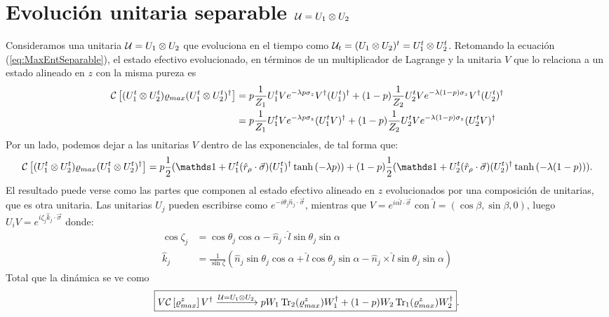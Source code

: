 \section{Evolución unitaria separable $\mathcal{U}=U_{1}\otimes U_{2}$}
Consideramos una unitaria $\mathcal{U}=U_{1}\otimes U_{2}$ que evoluciona en el tiempo como $\mathcal{U}_{t}=(U_{1}\otimes U_{2})^{t}=U_{1}^{t}\otimes U_{2}^{t}$. Retomando la ecuación (\ref{eq:MaxEntSeparable}), el estado efectivo evolucionado, en términos de un multiplicador de Lagrange y la unitaria $V$ que lo relaciona a un estado alineado en $z$ con la misma pureza es
\begin{align*}
    \mathcal{C}\left[(U_{1}^{t}\otimes U_{2}^{t})\varrho_{max}(U_{1}^{t}\otimes U_{2}^{t})^{\dag}\right]&=p\frac{1}{Z_{1}}U_{1}^{t}V e^{-\lambda p \sigma_{z}}V^{\dag}(U_{1}^t)^{\dag}+(1-p)\frac{1}{Z_{2}}U_{2}^{t}Ve^{-\lambda (1-p)\sigma_{z}}V^{\dag}(U_{2}^t)^{\dag}\\
    &=p\frac{1}{Z_{1}}U_{1}^{t}V e^{-\lambda p \sigma_{z}}(U_{1}^tV)^{\dag}+(1-p)\frac{1}{Z_{2}}U_{2}^{t}Ve^{-\lambda (1-p)\sigma_{z}}(U_{2}^tV)^{\dag}\\
\end{align*}
Por un lado, podemos dejar a las unitarias $V$ dentro de las exponenciales, de tal forma que:
\begin{equation}
    \CG{(U_{1}^{t}\otimes U_{2}^{t})\varrho_{max}(U_{1}^{t}\otimes U_{2}^{t})^{\dag}}=p\frac{1}{2}(\Id+U_{1}^{t}(\hat{r}_{\rho}\cdot\vec{\sigma})(U_{1}^{t})^{\dag}\tanh{(-\lambda p)})+(1-p)\frac{1}{2}(\Id+U_{2}^{t}(\hat{r}_{\rho}\cdot\vec{\sigma})(U_{2}^{t})^{\dag}\tanh{(-\lambda (1-p))}).
\end{equation}
El resultado puede verse como las partes que componen al estado efectivo alineado en $z$ evolucionados por una composición de unitarias, que es otra unitaria. Las unitarias $U_{j}$ pueden escribirse como $e^{-i\theta_{j} \hat{n}_{j}\cdot\vec{\sigma}}$, mientras que $V=e^{i\alpha\hat{l}\cdot\vec{\sigma}}$ con $\hat{l}=(\cos{\beta},\sin{\beta},0)$, luego $U_{i}V=e^{i\zeta_{j} \hat{k}_{j}\cdot \vec{\sigma}}$ donde:
\begin{align*}
    \cos{\zeta_{j} }&=\cos{\theta_{j}}\cos{\alpha}-\hat{n}_{j}\cdot \hat{l}\sin{\theta_{j}}\sin{\alpha}\\
    \hat{k}_{j} &=\frac{1}{\sin{\zeta}}(\hat{n}_{j}\sin{\theta_{j}}\cos{\alpha}+\hat{l}\cos{\theta_{j}}\sin{\alpha}-\hat{n}_{j}\times \hat{l}\sin{\theta_{j}}\sin{\alpha})
\end{align*}
Total que la dinámica se ve como
\begin{equation}
    \boxed{V\mathcal{C}\left[\varrho_{max}^{z}\right]V^{\dag} \xrightarrow{\mathcal{U}=U_{1}\otimes U_{2}} pW_{1}\Tr_{2}(\varrho_{max}^{z})W_{1}^{\dag}+(1-p)W_{2}\Tr_{1}(\varrho_{max}^{z})W_{2}^{\dag}}.
\end{equation}
